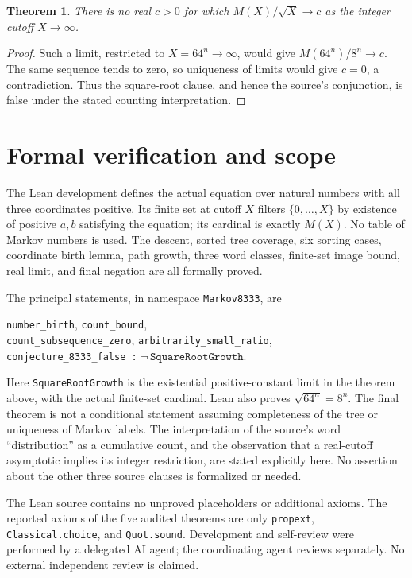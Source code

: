 \documentclass[11pt]{article}
\newtheorem{theorem}{Theorem}
\begin{document}
\begin{theorem}
There is no real $c>0$ for which $M(X)/\sqrt X\longrightarrow c$
as the integer cutoff $X\longrightarrow\infty$.
\end{theorem}
\begin{proof}
Such a limit, restricted to $X=64^n\longrightarrow\infty$, would
give $M(64^n)/8^n\longrightarrow c$. The same sequence tends to
zero, so uniqueness of limits would give $c=0$, a contradiction.
Thus the square-root clause, and hence the source's conjunction,
is false under the stated counting interpretation.
\end{proof}

\section*{Formal verification and scope}
The Lean development defines the actual equation over natural
numbers with all three coordinates positive. Its finite set at
cutoff $X$ filters $\{0,\ldots,X\}$ by existence of positive
$a,b$ satisfying the equation; its cardinal is exactly $M(X)$.
No table of Markov numbers is used. The descent, sorted tree
coverage, six sorting cases, coordinate birth lemma, path growth,
three word classes, finite-set image bound, real limit, and final
negation are all formally proved.

The principal statements, in namespace \texttt{Markov8333}, are
\begin{center}
\texttt{number\_birth}, \texttt{count\_bound},\\
\texttt{count\_subsequence\_zero}, \texttt{arbitrarily\_small\_ratio},\\
\texttt{conjecture\_8333\_false :}\quad
$\neg\,\texttt{SquareRootGrowth}$.
\end{center}
Here \texttt{SquareRootGrowth} is the existential positive-constant
limit in the theorem above, with the actual finite-set cardinal.
Lean also proves $\sqrt{64^n}=8^n$. The final theorem is not a
conditional statement assuming completeness of the tree or
uniqueness of Markov labels. The interpretation of the source's
word ``distribution'' as a cumulative count, and the observation
that a real-cutoff asymptotic implies its integer restriction,
are stated explicitly here. No assertion about the other three
source clauses is formalized or needed.

The Lean source contains no unproved placeholders or additional axioms.
The reported axioms of the five audited theorems are only
\texttt{propext}, \texttt{Classical.choice}, and \texttt{Quot.sound}.
Development and self-review were performed by a delegated AI agent;
the coordinating agent reviews separately. No external independent
review is claimed.
\end{document}
